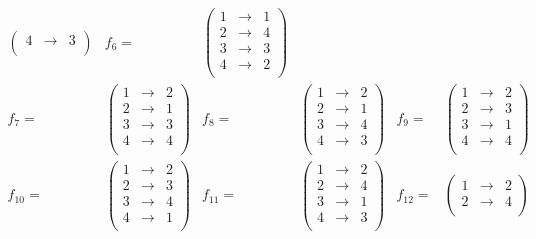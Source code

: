 \documentclass[11pt]{article}
\begin{document}
\begin{flushleft}
\begin{align*}
\begin{pmatrix}
4 & \rightarrow & 3\\
\end{pmatrix} &
f_6 = & 
\begin{pmatrix}
\mathit{1} & \rightarrow & 1\\
2 & \rightarrow & 4\\
\mathit{3} & \rightarrow & 3\\
4 & \rightarrow & 2\\
\end{pmatrix} \\
f_7 = &
\begin{pmatrix}
1 & \rightarrow & 2\\
2 & \rightarrow & 1\\
\mathit{3} & \rightarrow & 3\\
\mathit{4} & \rightarrow & 4\\
\end{pmatrix} &
f_8 = & 
\begin{pmatrix}
1 & \rightarrow & 2\\
2 & \rightarrow & 1\\
3 & \rightarrow & 4\\
4 & \rightarrow & 3\\
\end{pmatrix} &
f_9 = & 
\begin{pmatrix}
1 & \rightarrow & 2\\
2 & \rightarrow & 3\\
3 & \rightarrow & 1\\
4 & \rightarrow & 4\\
\end{pmatrix} \\
f_{10} = &
\begin{pmatrix}
1 & \rightarrow & 2\\
2 & \rightarrow & 3\\
3 & \rightarrow & 4\\
4 & \rightarrow & 1\\
\end{pmatrix} &
f_{11} = & 
\begin{pmatrix}
1 & \rightarrow & 2\\
2 & \rightarrow & 4\\
3 & \rightarrow & 1\\
4 & \rightarrow & 3\\
\end{pmatrix} &
f_{12} = & 
\begin{pmatrix}
1 & \rightarrow & 2\\
2 & \rightarrow & 4\\

\end{pmatrix}
\end{align*}
\end{flushleft}
\end{document}
